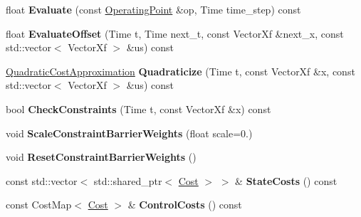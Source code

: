 \begin{DoxyCompactItemize}
\item 
float {\bfseries Evaluate} (const \hyperlink{structilqgames_1_1_operating_point}{Operating\+Point} \&op, Time time\+\_\+step) const \hypertarget{classilqgames_1_1_player_cost_a8c7fc17986dfb478df17cf9f8da85926}{}\label{classilqgames_1_1_player_cost_a8c7fc17986dfb478df17cf9f8da85926}

\item 
float {\bfseries Evaluate\+Offset} (Time t, Time next\+\_\+t, const Vector\+Xf \&next\+\_\+x, const std\+::vector$<$ Vector\+Xf $>$ \&us) const \hypertarget{classilqgames_1_1_player_cost_a56bf9c10b7ffa6fbdfb1a9bff1ce65c3}{}\label{classilqgames_1_1_player_cost_a56bf9c10b7ffa6fbdfb1a9bff1ce65c3}

\item 
\hyperlink{structilqgames_1_1_quadratic_cost_approximation}{Quadratic\+Cost\+Approximation} {\bfseries Quadraticize} (Time t, const Vector\+Xf \&x, const std\+::vector$<$ Vector\+Xf $>$ \&us) const \hypertarget{classilqgames_1_1_player_cost_ad3962847f8eda8bcfecf2096e6abccb6}{}\label{classilqgames_1_1_player_cost_ad3962847f8eda8bcfecf2096e6abccb6}

\item 
bool {\bfseries Check\+Constraints} (Time t, const Vector\+Xf \&x) const \hypertarget{classilqgames_1_1_player_cost_aecd3478584357f4ea5d743c14b842e71}{}\label{classilqgames_1_1_player_cost_aecd3478584357f4ea5d743c14b842e71}

\item 
void {\bfseries Scale\+Constraint\+Barrier\+Weights} (float scale=0.)\hypertarget{classilqgames_1_1_player_cost_a01099622def541cf226c94140c38d485}{}\label{classilqgames_1_1_player_cost_a01099622def541cf226c94140c38d485}

\item 
void {\bfseries Reset\+Constraint\+Barrier\+Weights} ()\hypertarget{classilqgames_1_1_player_cost_add7445e01947fcaaf9d5f1e392471970}{}\label{classilqgames_1_1_player_cost_add7445e01947fcaaf9d5f1e392471970}

\item 
const std\+::vector$<$ std\+::shared\+\_\+ptr$<$ \hyperlink{classilqgames_1_1_cost}{Cost} $>$ $>$ \& {\bfseries State\+Costs} () const \hypertarget{classilqgames_1_1_player_cost_adfb1861f05ba2efa163e7a28670f0585}{}\label{classilqgames_1_1_player_cost_adfb1861f05ba2efa163e7a28670f0585}

\item 
const Cost\+Map$<$ \hyperlink{classilqgames_1_1_cost}{Cost} $>$ \& {\bfseries Control\+Costs} () const \hypertarget{classilqgames_1_1_player_cost_a4fa0717c227acf2773deda56eaf62e99}{}\label{classilqgames_1_1_player_cost_a4fa0717c227acf2773deda56eaf62e99}


\end{DoxyCompactItemize}
